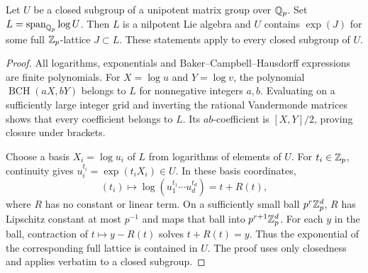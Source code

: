 \begin{lemma}
\label{lem:compact-log}
Let $U$ be a closed subgroup of a unipotent matrix group over $\mathbb Q_p$.
Set $L=\operatorname{span}_{\mathbb Q_p}\log U$.  Then $L$ is a nilpotent Lie
algebra and $U$ contains $\exp(J)$ for some full $\mathbb Z_p$-lattice
$J\subset L$.  These statements apply to every closed subgroup of $U$.
\end{lemma}
\begin{proof}
All logarithms, exponentials and Baker--Campbell--Hausdorff expressions
are finite polynomials.  For $X=\log u$ and $Y=\log v$, the polynomial
$\operatorname{BCH}(aX,bY)$ belongs to $L$ for nonnegative integers
$a,b$.  Evaluating on a sufficiently large integer grid and inverting
the rational Vandermonde matrices shows that every coefficient belongs
to $L$.  Its $ab$-coefficient is $[X,Y]/2$, proving closure under brackets.

Choose a basis $X_i=\log u_i$ of $L$ from logarithms of elements of $U$.
For $t_i\in\mathbb Z_p$, continuity gives $u_i^{t_i}=\exp(t_iX_i)\in U$.
In these basis coordinates,
\[
 (t_i)\longmapsto\log(u_1^{t_1}\cdots u_d^{t_d})=t+R(t),
\]
where $R$ has no constant or linear term.  On a sufficiently small ball
$p^r\mathbb Z_p^d$, $R$ has Lipschitz constant at most $p^{-1}$ and maps that
ball into $p^{r+1}\mathbb Z_p^d$.  For each $y$ in the ball, contraction of
$t\mapsto y-R(t)$ solves $t+R(t)=y$.  Thus the exponential of the
corresponding full lattice is contained in $U$.  The proof uses only
closedness and applies verbatim to a closed subgroup.
\end{proof}


